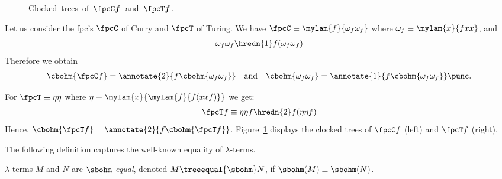 \begin{figure}[ht!]
  \begin{center}
  \caption{\mbox{Clocked \bohm{} trees of $\boldsymbol{\fpcC f}$ and $\boldsymbol{\fpcT f}$.}}
  \vspace{-4ex}
  \label{fig:boem:y0:y1}
  \end{center}
\end{figure}
Let us consider the fpc's $\fpcC$ of Curry and $\fpcT$ of Turing.
We have $\fpcC \equiv \mylam{f}{\omega_f\omega_f}$ 
where $\omega_f \equiv \mylam{x}{fxx}$, and
\begin{align*}
  \omega_f\omega_f \hredn{1} f (\omega_f\omega_f)
\end{align*}
Therefore we obtain 
\begin{align*}
  \cbohm{\fpcC f} = \annotate{2}{f \cbohm{\omega_f \omega_f}} 
  \quad\text{and}\quad
  \cbohm{\omega_f \omega_f} = \annotate{1}{f \cbohm{\omega_f \omega_f}}\punc.	
\end{align*}


For $\fpcT \equiv \eta \eta$ where $\eta \equiv \mylam{x}{\mylam{f}{f (xxf)}}$ we get:
\begin{align*}
  \fpcT f \equiv \eta \eta f \hredn{2} f (\eta \eta f)
\end{align*}
Hence, $\cbohm{\fpcT f} = \annotate{2}{f \cbohm{\fpcT f}}$.
Figure~\ref{fig:boem:y0:y1} displays the 
clocked \bohm{} trees of $\fpcC f$ (left) and $\fpcT f$ (right).

The following definition captures the well-known \boehm{} equality
of $\lambda$-terms.
\begin{definition}
  $\lambda$-terms $M$ and $N$ are \emph{$\sbohm$-equal},
  denoted $M \treeequal{\sbohm} N$,
  if $\sbohm(M) \equiv \sbohm(N)$.
\end{definition}


